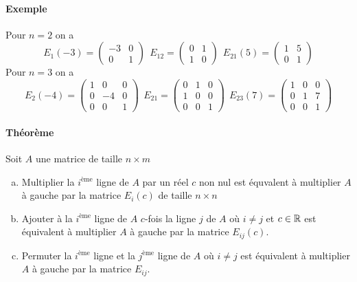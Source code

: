 \paragraph{Exemple} Pour $n = 2$ on a
$$E_1(-3) = \begin{pmatrix} -3 & 0 \\ 0 & 1 \end{pmatrix} ~~ 
  E_{1 2} = \begin{pmatrix} 0 & 1 \\ 1 &  0 \end{pmatrix} ~~ 
  E_{2 1}(5) = \begin{pmatrix} 1 & 5 \\ 0 & 1 \end{pmatrix}$$
Pour $n = 3$ on a
$$E_2(-4) = \begin{pmatrix} 1 & 0 & 0 \\ 0 & -4 & 0 \\ 0 & 0 & 1 \end{pmatrix} ~~
  E_{2 1} = \begin{pmatrix} 0 & 1 & 0 \\ 1 & 0 & 0 \\ 0 & 0 & 1 \end{pmatrix} ~~
  E_{2 3}(7) = \begin{pmatrix} 1 & 0 & 0 \\ 0 & 1 & 7 \\ 0 & 0 & 1 \end{pmatrix}$$

\paragraph{Théorème} Soit $A$ une matrice de taille $n\times m$
\begin{enumerate}[a)]
  \item Multiplier la $i^{\text{ème}}$ ligne de $A$ par un réel $c$ non nul est équvalent à multiplier $A$ à gauche par la matrice $E_i(c)$ de taille $n \times n$
  
  \item Ajouter à la $i^{\text{ème}}$ ligne de $A$ $c$-fois la ligne $j$ de $A$ où $i\neq j$ et $c\in \mathbb{R}$ est équivalent à multiplier $A$ à gauche par la matrice $E_{ij}(c)$.
  
  \item Permuter la $i^{\text{ème}}$ ligne et la $j^{\text{ème}}$ ligne de $A$ où $i\neq j$ est équivalent à multiplier $A$ à gauche par la matrice $E_{ij}$.
\end{enumerate}

